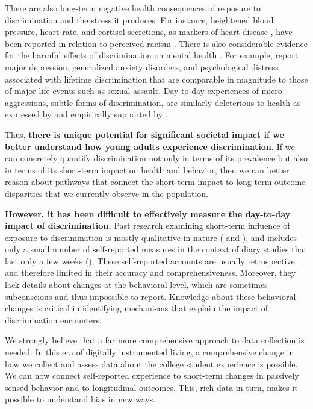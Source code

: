 There are also long-term negative health consequences of exposure to discrimination and the stress it produces. For instance, heightened blood pressure, heart rate, and cortisol secretions, as markers of heart disease \cite{Marshall:1997, Cohen:1994}, have been reported in relation to perceived racism \cite{Brondolo:2008, Steffen:2003, Smart:2010}. There is also considerable evidence for the harmful effects of discrimination on mental health \cite{Pascoe:2009}. For example, \citet{Kessler:1999} report major depression, generalized anxiety disorders, and psychological distress associated with lifetime discrimination that are comparable in magnitude to those of major life events such as sexual assault. Day-to-day experiences of micro-aggressions, subtle forms of discrimination, are similarly deleterious to health as expressed by \cite{Solorzano:2000} and empirically supported by \cite{Ong:2009}. 

Thus, \textbf{there is unique potential for significant societal impact if we better understand how young adults experience discrimination.} If we can concretely quantify discrimination not only in terms of its prevalence but also in terms of its short-term impact on health and behavior, then we can better reason about pathways that connect the short-term impact to long-term outcome disparities that we currently observe in the population. 

\textbf{However, it has been difficult to effectively measure the day-to-day impact of discrimination.} Past research examining short-term influence of exposure to discrimination is mostly qualitative in nature (\eg \cite{Swim:2003} and \cite{Solorzano:2000}), and includes only a small number of self-reported measures in the context of diary studies that last only a few weeks (\eg \cite{Ong:2009}). These self-reported accounts are usually retrospective and therefore limited in their accuracy and comprehensiveness. Moreover, they lack details about changes at the behavioral level, which are sometimes subconscious and thus impossible to report. Knowledge about these behavioral changes is critical in identifying mechanisms that explain the impact of discrimination encounters. 

We strongly believe that a far more comprehensive approach to data collection is needed. In this era of digitally instrumented living, a comprehensive change in how we collect and assess data about the college student experience is possible. We can now connect self-reported experience to short-term changes in passively sensed behavior and to longitudinal outcomes. This, rich data in turn, makes it possible to understand bias in  new ways.  

